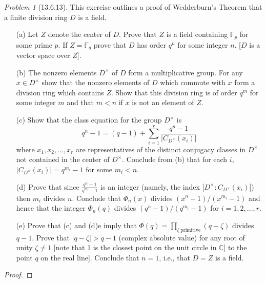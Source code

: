 \documentclass[10pt]{article}
\newcommand{\sk}{\vskip 10mm}
\newcommand{\bb}[1]{\mathbb{#1}}
\theoremstyle{remark}
\newtheorem{problem}{Problem}
\theoremstyle{remark}
\begin{document}
\begin{problem}[13.6.13]
  This exercise outlines a proof of Wedderburn's Theorem that a
  finite division ring $D$ is a field.
  \begin{enumerate}
  \item[(a)] Let $Z$ denote the center of $D$. Prove that $Z$ is
    a field containing $\bb{F}_p$ for some prime $p$. If $Z=\bb{F}_q$
    prove that $D$ has order $q^n$ for some integer $n$.
    [$D$ is a vector space over $Z$].
    
  \item[(b)] The nonzero elements $D^\times$ of $D$ form a multiplicative group.
    For any $x\in D^\times$ show that the nonzero elements of $D$ which commute
    with $x$ form a division ring which contains $Z$. Show that this
    division ring is of order $q^m$ for some integer $m$ and that $m<n$
    if $x$ is not an element of $Z$.
    
  \item[(c)] Show that the class equation for the group $D^\times$ is
    \[
      q^n-1=(q-1)+\sum_{i=1}^r\frac{q^n-1}{|C_{D^\times}(x_i)|}
    \]
    where $x_1,x_2,\ldots,x_r$ are representatives of the distinct
    conjugacy classes in $D^\times$ not contained in the center of $D^\times$.
    Conclude from (b) that for each $i$, $|C_{D^\times}(x_i)|=q^{m_i}-1$
    for some $m_i<n$.
    
  \item[(d)] Prove that since $\frac{q^n-1}{q^{m_i}-1}$ is an integer
    (namely, the index $|D^\times:C_{D^\times}(x_i)|$) then $m_i$ divides $n$.
    Conclude that $\Phi_n(x)$ divides $(x^n-1)/(x^{m_i}-1)$ and hence that the
    integer $\Phi_n(q)$ divides $(q^n-1)/(q^{m_i}-1)$ for $i=1,2,\ldots,r$.
    
  \item[(e)] Prove that (c) and (d)e imply that
    $\Phi(q)=\prod_{\zeta\ \mathrm{primitive}}(q-\zeta)$ divides $q-1$.
    Prove that $|q-\zeta|>q-1$ (complex absolute value) for any root
    of unity $\zeta\neq 1$ [note that 1 is the closest point on the unit circle
    in $\bb{C}$] to the point $q$ on the real line]. Conclude that
    $n=1$, i.e., that $D=Z$ is a field.
  \end{enumerate}
\end{problem}

\begin{proof}
  
\end{proof}

\sk
\end{document}

